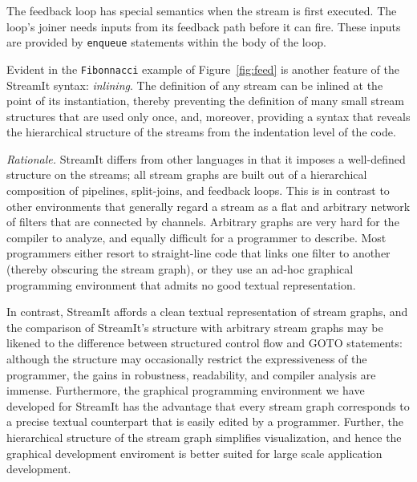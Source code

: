 The  feedback loop  has special  semantics  when the  stream is  first
executed.   The loop's  joiner  needs inputs  from  its feedback  path
before  it can fire.   These inputs  are provided  by \texttt{enqueue}
statements within the body of the loop.

Evident in the \texttt{Fibonnacci} example of Figure~\ref{fig:feed} is
another  feature   of  the  StreamIt   syntax:  \emph{inlining}.   The
definition  of  any  stream  can  be  inlined  at  the  point  of  its
instantiation, thereby preventing the  definition of many small stream
structures that are used only  once, and, moreover, providing a syntax
that  reveals  the hierarchical  structure  of  the  streams from  the
indentation level of the code.

\emph{Rationale.}  StreamIt differs from other languages in that it
imposes a well-defined structure on the streams; all stream graphs are
built out of a hierarchical composition of pipelines, split-joins, and
feedback  loops.   This is  in  contrast  to  other environments  that
generally regard a  stream as a flat and  arbitrary network of filters
that are  connected by channels.   Arbitrary graphs are very  hard for
the compiler  to analyze,  and equally difficult  for a  programmer to
describe.  Most  programmers either resort to  straight-line code that
links one filter  to another (thereby obscuring the  stream graph), or
they use  an ad-hoc graphical  programming environment that  admits no
good textual representation.

In contrast, StreamIt affords a clean textual representation of stream
graphs,  and the  comparison  of StreamIt's  structure with  arbitrary
stream  graphs may  be likened  to the  difference  between structured
control  flow  and  GOTO   statements:  although  the  structure  may
occasionally restrict the expressiveness  of the programmer, the gains
in  robustness,  readability,   and  compiler  analysis  are  immense.
Furthermore, the  graphical programming environment  we have developed
for StreamIt has the advantage  that every stream graph corresponds to
a precise textual  counterpart that is easily edited  by a programmer.
Further,  the hierarchical  structure of  the stream  graph simplifies
visualization,  and  hence  the  graphical development  enviroment  is
better suited for large scale application development.



